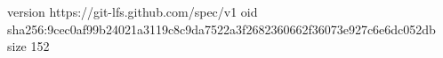 version https://git-lfs.github.com/spec/v1
oid sha256:9cec0af99b24021a3119c8c9da7522a3f2682360662f36073e927c6e6dc052db
size 152
